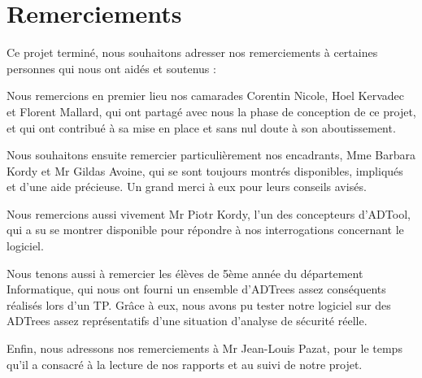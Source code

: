 \section{Remerciements}

Ce projet terminé, nous souhaitons adresser nos remerciements à certaines personnes qui nous ont aidés et soutenus :   

Nous remercions en premier lieu nos camarades Corentin {\sc Nicole}, Hoel {\sc Kervadec} et Florent {\sc Mallard}, qui ont partagé avec nous la phase de conception de ce projet, et qui ont contribué à sa mise en place et sans nul doute à son aboutissement.

Nous souhaitons ensuite remercier particulièrement nos encadrants, Mme Barbara {\sc Kordy} et Mr Gildas {\sc Avoine}, qui se sont toujours montrés disponibles, impliqués et d'une aide précieuse. Un grand merci à eux pour leurs conseils avisés.

Nous remercions aussi vivement Mr Piotr {\sc Kordy}, l'un des concepteurs d'ADTool, qui a su se montrer disponible pour répondre à nos interrogations concernant le logiciel.

Nous tenons aussi à remercier les élèves de 5ème année du département Informatique, qui nous ont fourni un ensemble d'ADTrees assez conséquents réalisés lors d'un TP. Grâce à eux, nous avons pu tester notre logiciel sur des ADTrees assez représentatifs d'une situation d'analyse de sécurité réelle.

Enfin, nous adressons nos remerciements à Mr Jean-Louis {\sc Pazat}, pour le temps qu'il a consacré à la lecture de nos rapports et au suivi de notre projet.